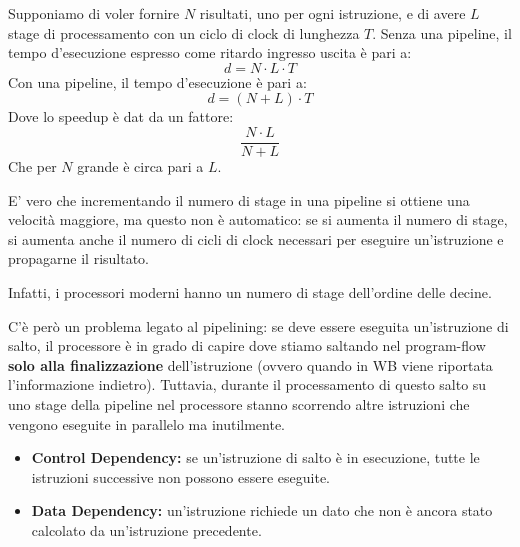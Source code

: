 \begin{theorem}\label{thm:pipeline}
    Supponiamo di voler fornire $N$ risultati, uno per ogni istruzione, e di avere $L$ stage di processamento con un ciclo di clock di lunghezza $T$. Senza una pipeline, il tempo d'esecuzione espresso come ritardo ingresso uscita è pari a:
    \begin{equation}
        d = N \cdot L \cdot T
    \end{equation}
    Con una pipeline, il tempo d'esecuzione è pari a:
    \begin{equation}
        d = (N+L)\cdot T
    \end{equation}
    Dove lo speedup è dat da un fattore:
    \begin{equation}
        \frac{N\cdot L}{N+L}
    \end{equation}
    Che per $N$ grande è circa pari a $L$.
\end{theorem}
\begin{remark}
    E' vero che incrementando il numero di stage in una pipeline si ottiene una velocità maggiore, ma questo non è automatico: se si aumenta il numero di stage, si aumenta anche il numero di cicli di clock necessari per eseguire un'istruzione e propagarne il risultato.

    Infatti, i processori moderni hanno un numero di stage dell'ordine delle decine.
\end{remark}
C'è però un problema legato al pipelining: se deve essere eseguita un'istruzione di salto, il processore è in grado di capire dove stiamo saltando nel program-flow \textbf{solo alla finalizzazione} dell'istruzione (ovvero quando in WB viene riportata l'informazione indietro). Tuttavia, durante il processamento di questo salto su uno stage della pipeline nel processore stanno scorrendo altre istruzioni che vengono eseguite in parallelo ma inutilmente.
\begin{remark}
    \begin{itemize}
        \item \textbf{Control Dependency:} se un'istruzione di salto è in esecuzione, tutte le istruzioni successive non possono essere eseguite.
        \item \textbf{Data Dependency:} un'istruzione richiede un dato che non è ancora stato calcolato da un'istruzione precedente.
    \end{itemize}
\end{remark}
